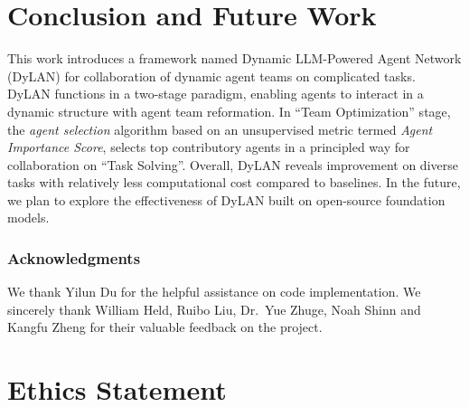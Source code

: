 \documentclass{article} %
\begin{document}
\section{Conclusion and Future Work}
This work introduces a framework named Dynamic LLM-Powered Agent Network (DyLAN) for collaboration of dynamic agent teams on complicated tasks. DyLAN functions in a two-stage paradigm, enabling agents to interact in a dynamic structure with agent team reformation. In ``Team Optimization'' stage, the \textit{agent selection} algorithm based on an unsupervised metric termed \textit{Agent Importance Score}, selects top contributory agents in a principled way for collaboration on ``Task Solving''. Overall, DyLAN reveals improvement on diverse tasks with relatively less computational cost compared to baselines. In the future, we plan to 
explore the effectiveness of DyLAN built on open-source foundation models. 



\subsubsection*{Acknowledgments}
We thank Yilun Du for the helpful assistance on code implementation.
We sincerely thank William Held, Ruibo Liu, Dr.~Yue Zhuge, Noah Shinn and Kangfu Zheng for their valuable feedback on the project.

\section*{Ethics Statement}
\end{document}
